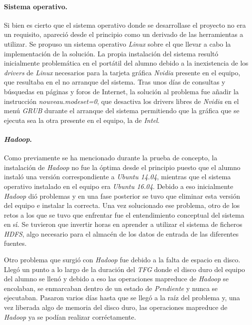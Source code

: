 \paragraph*{Sistema operativo.} Si bien es cierto que el sistema operativo donde se desarrollase el proyecto no era un requisito, apareció desde el principio como un derivado de las herramientas a utilizar. Se propuso un sistema operativo \textit{Linux} \cite{wikilinux} sobre el que llevar a cabo la implementación de la solución. 
La propia instalación del sistema resultó inicialmente problemática en el portátil del alumno debido a la inexistencia de los \textit{drivers} de \textit{Linux} necesarios para la tarjeta gráfica \textit{Nvidia} \cite{wikinvidia} presente en el equipo, que resultaba en el no arranque del sistema. Tras unos días de consultas y búsquedas en páginas y foros de Internet, la solución al problema fue añadir la instrucción \textit{nouveau.modeset=0}, que desactiva los drivers libres de \textit{Nvidia} en el menú \textit{GRUB} \cite{grub} durante el arranque del sistema permitiendo que la gráfica que se ejecuta sea la otra presente en el equipo, la de \textit{Intel}.

\paragraph*{\textit{Hadoop}.} Como previamente se ha mencionado durante la prueba de concepto, la instalación de \textit{Hadoop} no fue la óptima desde el principio puesto que el alumno instaló una versión correspondiente a \textit{Ubuntu 14.04}, mientras que el sistema operativo instalado en el equipo era \textit{Ubuntu 16.04}. Debido a eso inicialmente \textit{Hadoop} dió problemas y en una fase posterior se tuvo que eliminar esta versión del equipo e instalar la correcta. Una vez solucionado ese problema, otro de los retos a los que se tuvo que enfrentar fue el entendimiento conceptual del sistema en sí. Se tuvieron que invertir horas en aprender a utilizar el sistema de ficheros \textit{HDFS}, algo necesario para el almacén de los datos de entrada de las diferentes fuentes. 
\par
Otro problema que surgió con \textit{Hadoop} fue debido a la falta de espacio en disco. Llegó un punto a lo largo de la duración del \textit{TFG} donde el disco duro del equipo del alumno se llenó y debido a eso las operaciones \gls{mapreduce} de \textit{Hadoop} se encolaban, se enmarcaban dentro de un estado de \textit{Pendiente} y nunca se ejecutaban. Pasaron varios días hasta que se llegó a la raíz del problema y, una vez liberada algo de memoria del disco duro, las operaciones \gls{mapreduce} de \textit{Hadoop} ya se podían realizar corréctamente. 

